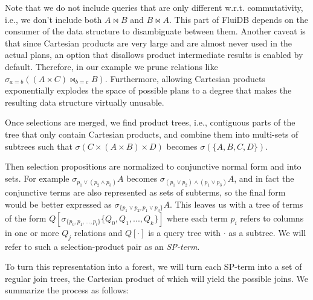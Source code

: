 Note that we do not include queries that are only different
w.r.t. commutativity, i.e., we don't include both \(A \Join B\) and
\(B \Join A\). This part of FluiDB depends on the consumer of the data
structure to disambiguate between them. Another caveat is that since
Cartesian products are very large and are almost never used in the
actual plans, an option that disallows product intermediate results is
enabled by default. Therefore, in our example we prune relations like
\(\sigma_{a=b}((A \times C) \Join_{b=c}B)\). Furthermore, allowing
Cartesian products exponentially explodes the space of possible plans
to a degree that makes the resulting data structure virtually
unusable.

Once selections are merged, we find product trees, i.e., contiguous
parts of the tree that only contain Cartesian products, and combine them
into multi-sets of subtrees such that \(\sigma(C \times (A \times B)
\times D)\) becomes \(\sigma(\{A,B,C,D\})\).

Then selection propositions are normalized to conjunctive normal form
and into sets. For example \(\sigma_{p_1 \lor (p_2 \land p_3)}A\)
becomes \(\sigma_{(p_1 \lor p_2) \land (p_1 \lor p_3)}A\), and in fact
the conjunctive terms are also represented as sets of subterms, so the
final form would be better expressed as \(\sigma_{\{p_1 \lor p_2,p_1
\lor p_3\}}A\). This leaves us with a tree of terms of the form
\(Q[\sigma_{\{p_0,p_1,...,p_l\}}\{Q_0,Q_1,...,Q_k\}]\) where each term
\(p_i\) refers to columns in one or more \(Q_j\) relations and
\(Q[\cdot]\) is a query tree with \(\cdot\) as a subtree. We will
refer to such a selection-product pair as an \emph{SP-term}.

To turn this representation into a forest, we will turn each SP-term
into a set of regular join trees, the Cartesian product of which will
yield the possible joins. We summarize the process as follows:

